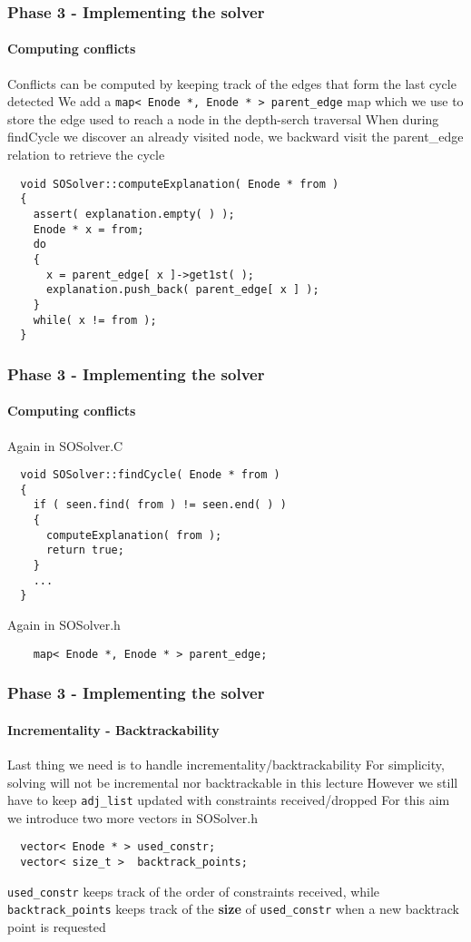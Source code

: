 \begin{frame}[fragile]
  \frametitle{Phase 3 - Implementing the solver}
  \framesubtitle{Computing conflicts}

  \scriptsize

  Conflicts can be computed by keeping track of
  the edges that form the last cycle detected 
  \vfill
  We add a \verb|map< Enode *, Enode * > parent_edge|
  map which we use to store the edge used to reach
  a node in the depth-serch traversal
  \vfill
  When during findCycle we discover an already visited
  node, we backward visit the parent\_edge relation
  to retrieve the cycle
  \vfill
  \begin{verbatim}
  void SOSolver::computeExplanation( Enode * from )
  {
    assert( explanation.empty( ) );
    Enode * x = from;
    do
    {
      x = parent_edge[ x ]->get1st( );
      explanation.push_back( parent_edge[ x ] );
    }
    while( x != from );
  }
  \end{verbatim}

\end{frame}

\begin{frame}[fragile]
  \frametitle{Phase 3 - Implementing the solver}
  \framesubtitle{Computing conflicts}

  \scriptsize

  Again in SOSolver.C

  \begin{verbatim}
  void SOSolver::findCycle( Enode * from )
  {
    if ( seen.find( from ) != seen.end( ) )
    {
      computeExplanation( from );
      return true;
    }
    ...
  }
  \end{verbatim}

  \vfill
  Again in SOSolver.h

  \begin{verbatim}
    map< Enode *, Enode * > parent_edge;
  \end{verbatim}

\end{frame}

\begin{frame}[fragile]
  \frametitle{Phase 3 - Implementing the solver}
  \framesubtitle{Incrementality - Backtrackability}

  Last thing we need is to handle incrementality/backtrackability
  \vfill
  For simplicity, solving will not be incremental nor backtrackable in this lecture
  \vfill
  However we still have to keep \verb|adj_list| updated with constraints received/dropped
  \vfill
  For this aim we introduce two more vectors in SOSolver.h

  \begin{verbatim}
  vector< Enode * > used_constr;
  vector< size_t >  backtrack_points;
  \end{verbatim}

  \verb|used_constr| keeps track of the order of constraints received,
  while \verb|backtrack_points| keeps track of the {\bf size} of 
  \verb|used_constr| when a new backtrack point is requested

\end{frame}


